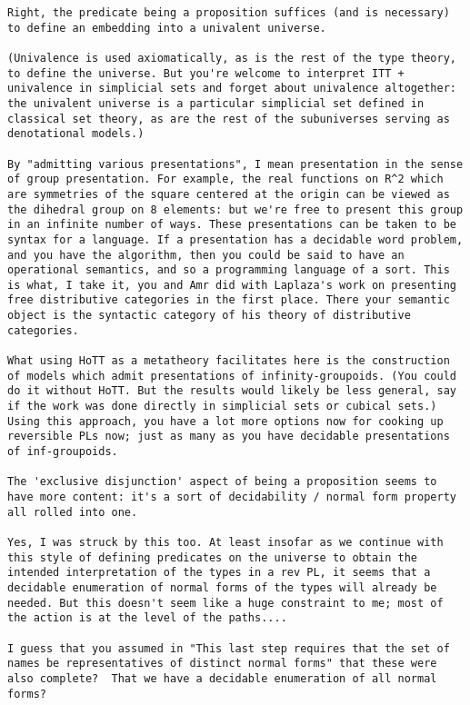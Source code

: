 \documentclass{entcs}
\begin{document}
\begin{verbatim}
Right, the predicate being a proposition suffices (and is necessary) to define an embedding into a univalent universe.

(Univalence is used axiomatically, as is the rest of the type theory, to define the universe. But you're welcome to interpret ITT + univalence in simplicial sets and forget about univalence altogether: the univalent universe is a particular simplicial set defined in classical set theory, as are the rest of the subuniverses serving as denotational models.)

By "admitting various presentations", I mean presentation in the sense of group presentation. For example, the real functions on R^2 which are symmetries of the square centered at the origin can be viewed as the dihedral group on 8 elements: but we're free to present this group in an infinite number of ways. These presentations can be taken to be syntax for a language. If a presentation has a decidable word problem, and you have the algorithm, then you could be said to have an operational semantics, and so a programming language of a sort. This is what, I take it, you and Amr did with Laplaza's work on presenting free distributive categories in the first place. There your semantic object is the syntactic category of his theory of distributive categories.

What using HoTT as a metatheory facilitates here is the construction of models which admit presentations of infinity-groupoids. (You could do it without HoTT. But the results would likely be less general, say if the work was done directly in simplicial sets or cubical sets.) Using this approach, you have a lot more options now for cooking up reversible PLs now; just as many as you have decidable presentations of inf-groupoids.

The 'exclusive disjunction' aspect of being a proposition seems to have more content: it's a sort of decidability / normal form property all rolled into one.

Yes, I was struck by this too. At least insofar as we continue with this style of defining predicates on the universe to obtain the intended interpretation of the types in a rev PL, it seems that a decidable enumeration of normal forms of the types will already be needed. But this doesn't seem like a huge constraint to me; most of the action is at the level of the paths....

I guess that you assumed in "This last step requires that the set of names be representatives of distinct normal forms" that these were also complete?  That we have a decidable enumeration of all normal forms?


\end{verbatim}
\end{document}

